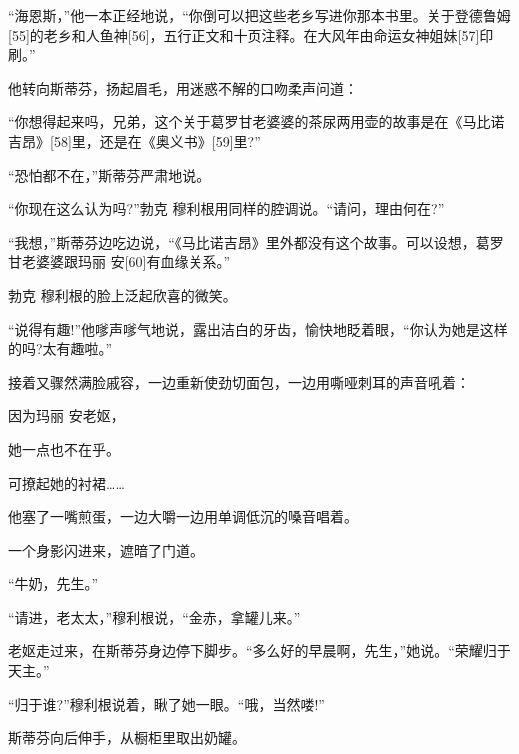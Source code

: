 \documentclass{article}
\begin{document}
“海恩斯，”他一本正经地说，“你倒可以把这些老乡写进你那本书里。关于登德鲁姆[55]的老乡和人鱼神[56]，五行正文和十页注释。在大风年由命运女神姐妹[57]印刷。”



他转向斯蒂芬，扬起眉毛，用迷惑不解的口吻柔声问道：



“你想得起来吗，兄弟，这个关于葛罗甘老婆婆的茶尿两用壶的故事是在《马比诺吉昂》[58]里，还是在《奥义书》[59]里?”



“恐怕都不在，”斯蒂芬严肃地说。



“你现在这么认为吗?”勃克 \cdot 穆利根用同样的腔调说。“请问，理由何在?”



“我想，”斯蒂芬边吃边说，“《马比诺吉昂》里外都没有这个故事。可以设想，葛罗甘老婆婆跟玛丽 \cdot 安[60]有血缘关系。”



勃克 \cdot 穆利根的脸上泛起欣喜的微笑。



“说得有趣!”他嗲声嗲气地说，露出洁白的牙齿，愉快地眨着眼，“你认为她是这样的吗?太有趣啦。”



接着又骤然满脸戚容，一边重新使劲切面包，一边用嘶哑刺耳的声音吼着：



因为玛丽 \cdot 安老妪，



她一点也不在乎。



可撩起她的衬裙……



他塞了一嘴煎蛋，一边大嚼一边用单调低沉的嗓音唱着。



一个身影闪进来，遮暗了门道。



“牛奶，先生。”



“请进，老太太，”穆利根说，“金赤，拿罐儿来。”



老妪走过来，在斯蒂芬身边停下脚步。“多么好的早晨啊，先生，”她说。“荣耀归于天主。”



“归于谁?”穆利根说着，瞅了她一眼。“哦，当然喽!”



斯蒂芬向后伸手，从橱柜里取出奶罐。
\end{document}
